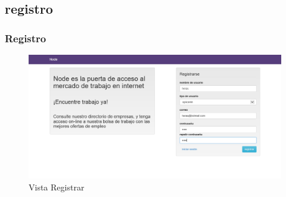 \subsection{registro}
\frame
{
  \frametitle{Registro}
  
	\begin{figure}[h]
	\begin{center}
	 	\includegraphics[scale=0.20]{./resources/vistas/registro.png} 
		\caption{Vista Registrar}
	\end{center}
	\end{figure}
}